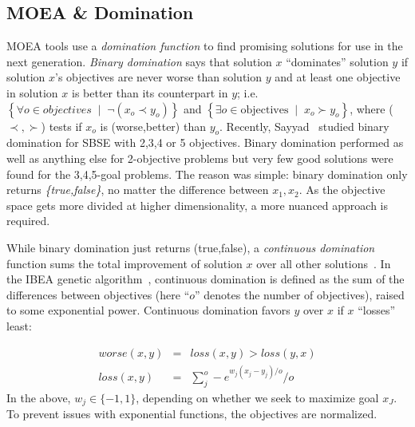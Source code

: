 \documentclass[10pt,journal,compsoc]{IEEEtran}
\begin{document}
\subsection{MOEA \& Domination}\label{sec:cdom}

MOEA tools
use a
{\em  domination function} to find
promising solutions for use in the next generation.
{\em Binary domination} says that solution $x$ ``dominates''
solution $y$ if solution $x$'s objectives are never worse than  solution $y$
and at least one objective in solution $x$ is better than its counterpart in $y$; i.e.
 $\left\{ \forall o  \in \textit{objectives}\;\mid\; \neg ( x_o \prec y_o )\right\}$
and
 $\left\{
\exists o \in \text{objectives} \;\mid\; x_o \succ y_o\right\}$, where ($\prec,\succ$) tests if $x_o$ is (worse,better) than $y_o$.
 Recently, Sayyad~\cite{sayyad13a} studied binary domination for SBSE
with 2,3,4 or 5 objectives.  Binary domination performed as well as anything else
for 2-objective problems but very few good solutions were found for
the 3,4,5-goal problems.  The reason was simple: binary domination  only returns
{\em \{true,false\}}, no matter the difference between $x_1,x_2$. As the objective
space gets more divided at higher dimensionality, a more nuanced approach is required.


While binary domination just returns (true,false), a {\em continuous domination} function sums
the total improvement of solution $x$ over all other solutions~\cite{Zitzler04indicator-basedselection}.
In the IBEA genetic algorithm~\cite{Zitzler04indicator-basedselection}, continuous domination is defined as the sum of the
differences between objectives (here ``$o$'' denotes the number of objectives),
raised to some exponential power.
Continuous domination favors $y$ over $x$ if $x$ ``losses'' least:

\begin{equation}\label{eq:cdom}
\begin{array}{rcl}
\textit{worse}(x,y)& =& \textit{loss}(x,y) > \textit{loss}(y,x)\\
\textit{loss}(x,y)& = &\sum_j^o -e^{w_j(x_j - y_j)/o	} / o
\end{array}
\end{equation}
In the above, $w_j\in \{-1,1\}$, depending on whether
we seek to maximize goal $x_J$.   
To prevent issues with exponential functions,
the objectives are normalized.
\end{document}
